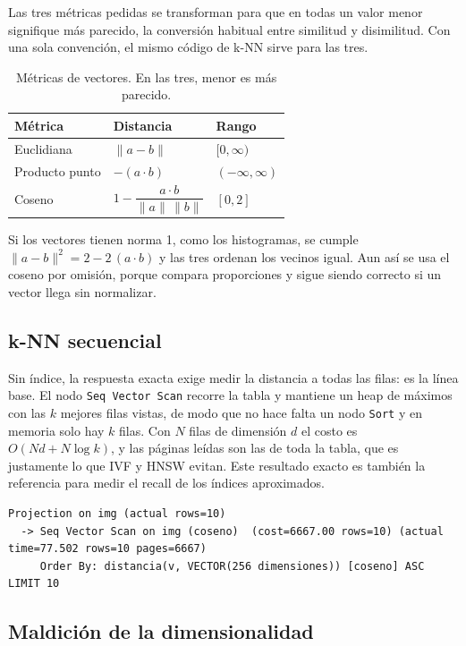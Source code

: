 \documentclass[11pt,a4paper]{article}
\begin{document}
Las tres métricas pedidas se transforman para que en todas un valor menor signifique más parecido, la conversión habitual entre similitud y disimilitud. Con una sola convención, el mismo código de k-NN sirve para las tres.

\begin{table}[H]
\centering
\begin{tabular}{lll}
\toprule
Métrica & Distancia & Rango \\
\midrule
Euclidiana & $\lVert a - b \rVert$ & $[0, \infty)$ \\
Producto punto & $-(a \cdot b)$ & $(-\infty, \infty)$ \\
Coseno & $1 - \dfrac{a \cdot b}{\lVert a \rVert\,\lVert b \rVert}$ & $[0, 2]$ \\
\bottomrule
\end{tabular}
\caption{Métricas de vectores. En las tres, menor es más parecido.}
\end{table}

Si los vectores tienen norma 1, como los histogramas, se cumple $\lVert a - b \rVert^2 = 2 - 2\,(a \cdot b)$ y las tres ordenan los vecinos igual. Aun así se usa el coseno por omisión, porque compara proporciones y sigue siendo correcto si un vector llega sin normalizar.

\subsection{k-NN secuencial}

Sin índice, la respuesta exacta exige medir la distancia a todas las filas: es la línea base. El nodo \texttt{Seq Vector Scan} recorre la tabla y mantiene un heap de máximos con las $k$ mejores filas vistas, de modo que no hace falta un nodo \texttt{Sort} y en memoria solo hay $k$ filas. Con $N$ filas de dimensión $d$ el costo es $O(N d + N \log k)$, y las páginas leídas son las de toda la tabla, que es justamente lo que IVF y HNSW evitan. Este resultado exacto es también la referencia para medir el recall de los índices aproximados.

\begin{lstlisting}
Projection on img (actual rows=10)
  -> Seq Vector Scan on img (coseno)  (cost=6667.00 rows=10) (actual time=77.502 rows=10 pages=6667)
     Order By: distancia(v, VECTOR(256 dimensiones)) [coseno] ASC LIMIT 10
\end{lstlisting}

\subsection{Maldición de la dimensionalidad}
\label{sec:dimensionalidad}
\end{document}
